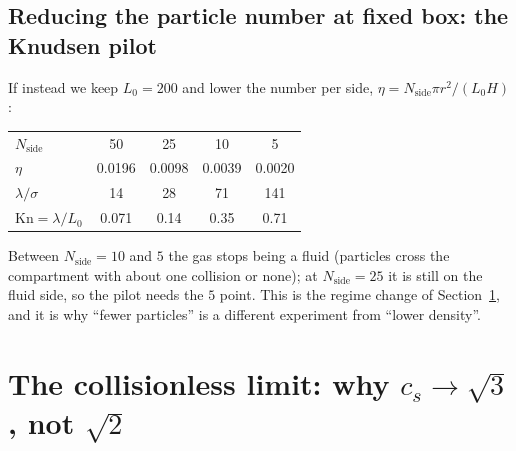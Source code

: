\documentclass[11pt,a4paper]{article}
\begin{document}
\subsection{Reducing the particle number at fixed box: the Knudsen pilot}
If instead we keep $L_0 = 200$ and lower the number per side, $\eta = N_{\mathrm{side}}\pi r^2/(L_0 H)$:
\begin{worked}
\begin{tabular}{@{}lcccc@{}}
\toprule
$N_{\mathrm{side}}$ & 50 & 25 & 10 & 5\\
$\eta$ & 0.0196 & 0.0098 & 0.0039 & 0.0020\\
$\lambda/\sigma$ & 14 & 28 & 71 & 141\\
$\mathrm{Kn} = \lambda/L_0$ & 0.071 & 0.14 & 0.35 & 0.71\\
\bottomrule
\end{tabular}

Between $N_{\mathrm{side}} = 10$ and $5$ the gas stops being a fluid (particles cross the compartment with about one collision or none); at $N_{\mathrm{side}} = 25$ it is still on the fluid side, so the pilot needs the $5$ point. This is the regime change of Section~\ref{sec:collisionless}, and it is why ``fewer particles'' is a different experiment from ``lower density''.
\end{worked}

\section{The collisionless limit: why \texorpdfstring{$c_s \to \sqrt3$, not $\sqrt2$}{cs -> sqrt3, not sqrt2}}
\label{sec:collisionless}
\end{document}
